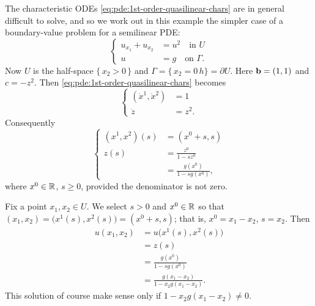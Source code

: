 \begin{example}
  The characteristic ODEs \eqref{eq:pde:1st-order-quasilinear-chars} are in
  general difficult to solve, and so we work out in this example the
  simpler case of a boundary-value problem for a semilinear PDE:
  \begin{equation}
    \label{eq:pde:quasilinear-ex-2}
    \left\{
      \begin{aligned}
        u_{x_1}+u_{x_2}&=u^2\quad\text{in \(U\)}\\
        u&=g\quad\text{on \(\Gamma\).}
      \end{aligned}
    \right.
  \end{equation}
  Now \(U\) is the half-space \(\{\,x_2>0\,\}\) and
  \(\Gamma=\{\,x_2=0\,h\}=\partial U\). Here \(\mathbf{b}=(1,1)\) and
  \(c=-z^2\). Then \eqref{eq:pde:1st-order-quasilinear-chars} becomes
  \[
    \left\{
      \begin{aligned}
        (\dot{x}^1,\dot{x}^2)&=1\\
        \dot z&=z^2.
      \end{aligned}
    \right.
  \]
  Consequently
  \[
    \left\{
    \begin{aligned}
      (x^1,x^2)(s)&=(x^0+s,s)\\
      z(s)&=\frac{z^0}{1-sz^0}\\
      &=\frac{g(x^0)}{1-sg(x^0)},
    \end{aligned}
    \right.
  \]
  where \(x^0\in\mathbb{R}\), \(s\geq 0\), provided the denominator is not zero.

  Fix a point \(x_1,x_2\in U\). We select \(s>0\) and \(x^0\in\mathbb{R}\) so
  that \((x_1,x_2)=\bigl( x^1(s),x^2(s) \bigr)=(x^0+s,s)\); that is,
  \(x^0=x_1-x_2\), \(s=x_2\). Then
  \begin{align*}
    u(x_1,x_2)&=u\bigl( x^1(s),x^2(s) \bigr)\\
              &=z(s)\\
              &=\frac{g(x^0)}{1-sg(x^0)}\\
              &=\frac{g(x_1-x_2)}{1-x_2g(x_1-x_2)}.
  \end{align*}
  This solution of course make sense only if \(1-x_2g(x_1-x_2)\neq 0\).
\end{example}


